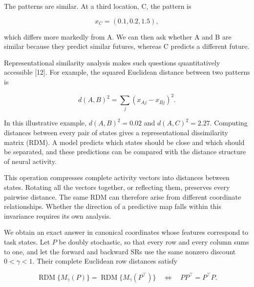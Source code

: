 \documentclass[11pt,a4paper]{article}
\begin{document}
\par
\noindent\begin{minipage}{\linewidth}

The patterns are similar. At a third location, C, the pattern is

\[
x_C=(0.1,0.2,1.5),
\]

\end{minipage}\par

which differs more markedly from A. We can then ask whether A and B are
similar because they predict similar futures, whereas C predicts a
different future.

\par
\noindent\begin{minipage}{\linewidth}

Representational similarity analysis makes such questions quantitatively
accessible {[}12{]}. For example, the squared Euclidean distance between
two patterns is

\[
d(A,B)^2=\sum_j(x_{Aj}-x_{Bj})^2.
\]

\end{minipage}\par

In this illustrative example, \(d(A,B)^2=0.02\) and \(d(A,C)^2=2.27\).
Computing distances between every pair of states gives a
representational dissimilarity matrix (RDM). A model predicts which
states should be close and which should be separated, and these
predictions can be compared with the distance structure of neural
activity.

This operation compresses complete activity vectors into distances
between states. Rotating all the vectors together, or reflecting them,
preserves every pairwise distance. The same RDM can therefore arise from
different coordinate relationships. Whether the direction of a
predictive map falls within this invariance requires its own analysis.

\par
\noindent\begin{minipage}{\linewidth}

We obtain an exact answer in canonical coordinates whose features
correspond to task states. Let \(P\) be doubly stochastic, so that every
row and every column sums to one, and let the forward and backward SRs
use the same nonzero discount \(0<\gamma<1\). Their complete Euclidean
row distances satisfy

\[
\operatorname{RDM}\{M_\gamma(P)\}
=\operatorname{RDM}\{M_\gamma(P^\top)\}
\quad\Longleftrightarrow\quad
PP^\top=P^\top P.
\]

\end{minipage}\par
\end{document}

